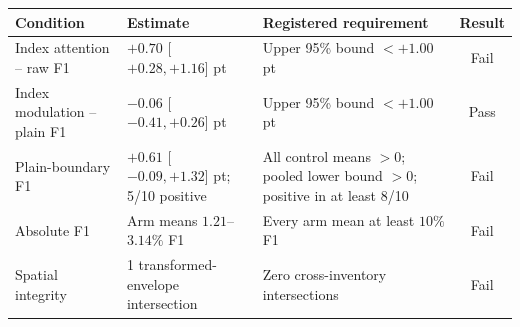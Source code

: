 \begin{tabular}{@{}p{}p{}p{}c@{}}
\toprule
Condition & Estimate & Registered requirement & Result \\
\midrule
Index attention -- raw F1 &
$+0.70$ [$+0.28,+1.16$] pt &
Upper 95\% bound $<+1.00$ pt & Fail \\
Index modulation -- plain F1 &
$-0.06$ [$-0.41,+0.26$] pt &
Upper 95\% bound $<+1.00$ pt & Pass \\
Plain-boundary F1 &
$+0.61$ [$-0.09,+1.32$] pt; 5/10 positive &
All control means $>0$; pooled lower bound $>0$; positive in at least 8/10 &
Fail \\
Absolute F1 &
Arm means $1.21$--$3.14\%$ F1 &
Every arm mean at least $10\%$ F1 & Fail \\
Spatial integrity &
1 transformed-envelope intersection &
Zero cross-inventory intersections & Fail \\
\bottomrule
\end{tabular}
